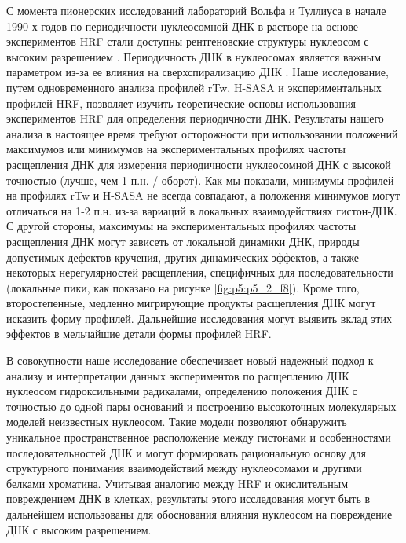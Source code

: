 С момента пионерских исследований лабораторий Вольфа и Туллиуса в начале 1990-х годов по периодичности нуклеосомной ДНК в растворе на основе экспериментов HRF \cite{hayes_structure_1990,hayes_histone_1991,hayes_histone_1991-1,bashkin_structure_1993} стали доступны рентгеновские структуры нуклеосом с высоким разрешением \cite{luger_crystal_1997}. Периодичность ДНК в нуклеосомах является важным параметром из-за ее влияния на сверхспирализацию ДНК \cite{klug_helical_1981}. Наше исследование, путем одновременного анализа профилей rTw, H-SASA и экспериментальных профилей HRF, позволяет изучить теоретические основы использования экспериментов HRF для определения периодичности ДНК. Результаты нашего анализа в настоящее время требуют осторожности при использовании положений максимумов или минимумов на экспериментальных профилях частоты расщепления ДНК для измерения периодичности нуклеосомной ДНК с высокой точностью (лучше, чем 1 п.н. / оборот). Как мы показали, минимумы профилей на профилях rTw и H-SASA не всегда совпадают, а положения минимумов могут отличаться на 1-2 п.н. из-за вариаций в локальных взаимодействиях гистон-ДНК. С другой стороны, максимумы на экспериментальных профилях частоты расщепления ДНК могут зависеть от локальной динамики ДНК, природы допустимых дефектов кручения, других динамических эффектов, а также некоторых нерегулярностей расщепления, специфичных для последовательности (локальные пики, как показано на рисунке \ref{fig:p5:p5_2_f8}). Кроме того, второстепенные, медленно мигрирующие продукты расщепления ДНК могут исказить форму профилей. Дальнейшие исследования могут выявить вклад этих эффектов в мельчайшие детали формы профилей HRF.

В совокупности наше исследование обеспечивает новый надежный подход к анализу и интерпретации данных экспериментов по расщеплению ДНК нуклеосом гидроксильными радикалами, определению положения ДНК с точностью до одной пары оснований и построению высокоточных молекулярных моделей неизвестных нуклеосом. Такие модели позволяют обнаружить уникальное пространственное расположение между гистонами и особенностями последовательностей ДНК и могут формировать рациональную основу для структурного понимания взаимодействий между нуклеосомами и другими белками хроматина. Учитывая аналогию между HRF и окислительным повреждением ДНК в клетках, результаты этого исследования могут быть в дальнейшем использованы для обоснования влияния нуклеосом на повреждение ДНК с высоким разрешением.



